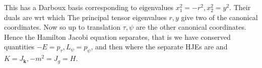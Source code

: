 \documentclass{article}
\begin{document}
This has a Darboux basis 
corresponding to eigenvalues $x_1^2 = -r^2, x_2^2 = y^2$. Their duals are 
wrt which 
The principal tensor eigenvalues $r,y$ give two of the canonical coordinates. Now 
so up to translation $\tau,\psi$ are the other canonical coordinates. Hence the Hamilton Jacobi equation separates, that is we have conserved quantities $-E = p_\tau, L_\psi = p_\psi$, and then 
where the separate HJEs are 
and 
$K = J_{\bm{k}},-m^2 = J_g =H$. 


\end{document}
